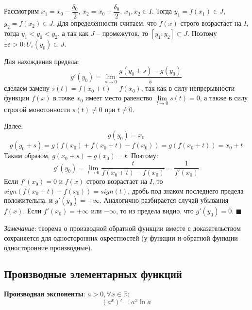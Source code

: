 \documentclass[12pt, a4paper, reqno]{article}
\begin{document}
    Рассмотрим $x_1 = x_0 - \dfrac{\delta_0}{2}$, $x_2 = x_0 + \dfrac{\delta_0}{2}$, $x_1, x_2\in I$.
    Тогда $y_1 = f(x_1)\in J$, $y_2 = f(x_2)\in J$. Для определённости считаем, что $f(x)$ строго
    возрастает на $I$, тогда $y_1 < y_0 < y_2$, а так как $J$ -- промежуток, то $[y_1; y_2]\subset J$.
    Поэтому $\exists\varepsilon > 0: U_{\varepsilon}(y_0)\subset J$.

    Для нахождения предела:
    \begin{equation*}
        g'(y_0) = \lim\limits_{s\to 0}\dfrac{g(y_0 + s) - g(y_0)}{s}
    \end{equation*}
    сделаем замену $s(t) = f(x_0 + t) - f(x_0)$, так как в силу непрерывности функции $f(x)$ в точке
    $x_0$ имеет место равенство $\lim\limits_{t\to 0} s(t) = 0$, а также в силу строгой монотонности
    $s(t)\neq 0$ при $t\neq 0$.

    Далее:
    \begin{equation*}
        g(y_0) = x_0
    \end{equation*}
    \begin{equation*}
        g(y_0 + s) = g(f(x_0) +  f(x_0 + t) - f(x_0)) = g(f(x_0 + t)) = x_0 + t
    \end{equation*}
    Таким образом, $g(x_0 + s) - g(x_0) = t$. Поэтому:
    \begin{equation*}
        g'(y_0) = \lim\limits_{t\to 0} \dfrac{t}{f(x_0 + t) - f(x_0)} = \dfrac{1}{f'(x_0)}
    \end{equation*}
    Если $f'(x_0) = 0$ и $f(x)$ строго возрастает на $I$, то $sign(f(x_0 + t) - f(x_0)) = sign(t)$,
    дробь под знаком последнего предела положительна, и $g'(y_0) = +\infty$. Аналогично разбирается
    случай убывания $f(x)$. Если $f'(x_0) = +\infty$ или $-\infty$, то из предела видно, что
    $g'(y_0) = 0$. $\blacksquare$

    \textit{Замечание}: теорема о производной обратной функции вместе с доказательством сохраняется
    для односторонних окрестностей (у функции и обратной функции односторонние производные).

\subsection{Производные элементарных функций}

    \textbf{Производная экспоненты}: $a > 0, \forall x\in\mathbb{R}:$
    \begin{equation*}
        (a^x)' = a^x\ln{a}
    \end{equation*}
\end{document}
